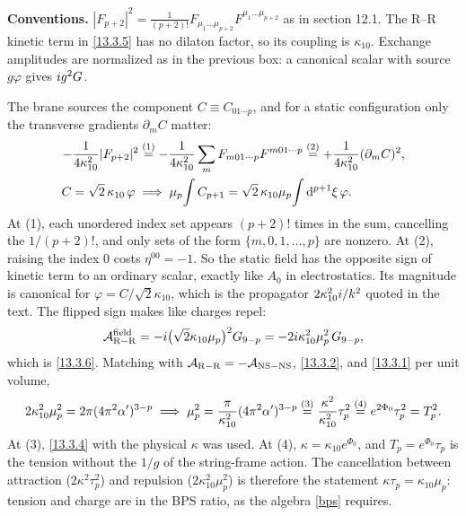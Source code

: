 \begin{tcolorbox}[breakable]
	\begin{remark}
		\textbf{Conventions.} $|F_{p+2}|^2=\frac{1}{(p+2)!}F_{\mu_1\dots\mu_{p+2}}F^{\mu_1\dots\mu_{p+2}}$ as in section 12.1. The R--R kinetic term in \eqref{13.3.5} has no dilaton factor, so its coupling is $\kappa_{10}$. Exchange amplitudes are normalized as in the previous box: a canonical scalar with source $g\varphi$ gives $i g^2G$.

		The brane sources the component $C\equiv C_{01\cdots p}$, and for a static configuration only the transverse gradients $\partial_mC$ matter:
		\begin{align*}
			-\frac{1}{4\kappa_{10}^2}|F_{p+2}|^2 &\overset{(1)}{=} -\frac{1}{4\kappa_{10}^2}\sum_m F_{m01\cdots p}F^{m01\cdots p}
			\overset{(2)}{=} +\frac{1}{4\kappa_{10}^2}(\partial_mC)^2 ,\\
			C=\sqrt2\,\kappa_{10}\,\varphi \;&\Longrightarrow\; \mu_p\!\int C_{p+1} = \sqrt2\,\kappa_{10}\mu_p\!\int\mathrm{d}^{p+1}\xi\,\varphi .
		\end{align*}
		At (1), each unordered index set appears $(p+2)!$ times in the sum, cancelling the $1/(p+2)!$, and only sets of the form $\{m,0,1,\dots,p\}$ are nonzero. At (2), raising the index 0 costs $\eta^{00}=-1$. So the static field has the opposite sign of kinetic term to an ordinary scalar, exactly like $A_0$ in electrostatics. Its magnitude is canonical for $\varphi=C/\sqrt2\kappa_{10}$, which is the propagator $2\kappa_{10}^2i/k^2$ quoted in the text. The flipped sign makes like charges repel:
		\begin{equation*}
			\mathcal A_{\rm R-R}^{\rm field} = -i\bigl(\sqrt2\kappa_{10}\mu_p\bigr)^2G_{9-p} = -2i\kappa_{10}^2\mu_p^2\,G_{9-p},
		\end{equation*}
		which is \eqref{13.3.6}. Matching with $\mathcal A_{\rm R-R}=-\mathcal A_{\rm NS-NS}$, \eqref{13.3.2}, and \eqref{13.3.1} per unit volume,
		\begin{align*}
			2\kappa_{10}^2\mu_p^2 = 2\pi(4\pi^2\alpha')^{3-p} \;\Longrightarrow\; \mu_p^2=\frac{\pi}{\kappa_{10}^2}(4\pi^2\alpha')^{3-p} \overset{(3)}{=} \frac{\kappa^2}{\kappa_{10}^2}\tau_p^2 \overset{(4)}{=} e^{2\Phi_0}\tau_p^2 = T_p^2 .
		\end{align*}
		At (3), \eqref{13.3.4} with the physical $\kappa$ was used. At (4), $\kappa=\kappa_{10}e^{\Phi_0}$, and $T_p=e^{\Phi_0}\tau_p$ is the tension without the $1/g$ of the string-frame action. The cancellation between attraction ($2\kappa^2\tau_p^2$) and repulsion ($2\kappa_{10}^2\mu_p^2$) is therefore the statement $\kappa\tau_p=\kappa_{10}\mu_p$: tension and charge are in the BPS ratio, as the algebra \eqref{bps} requires.
	\end{remark}
\end{tcolorbox}

